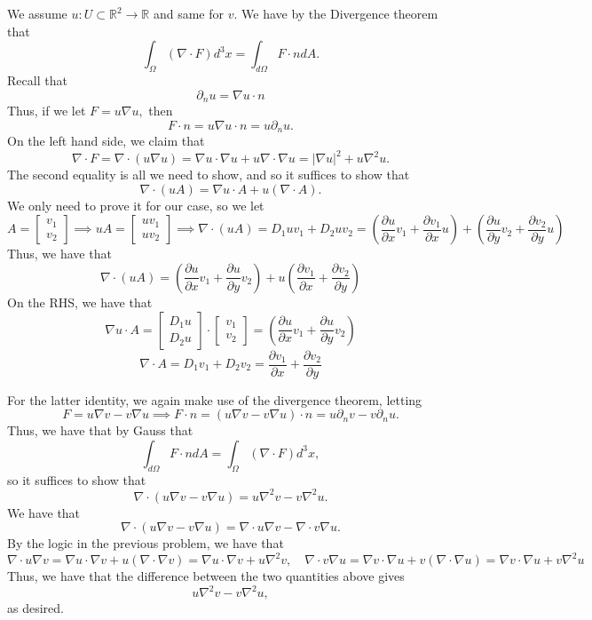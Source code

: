 \documentclass[11pt]{article}
\newcommand{\bbR}{\mathbb{R}}
\begin{document}
\begin{solution}
    We assume $u: U \subset \bbR^2 \to \bbR$ and same for $v.$ We have by the Divergence theorem that 
    \[\int_\Omega (\nabla \cdot F) d^3x = \int_{d\Omega} F \cdot n dA.\]
    Recall that  
    \[\partial_n u  = \nabla u \cdot n\]
    Thus, if we let $F = u\nabla u,$ then \[F\cdot n = u\nabla u \cdot n = u\partial_nu.\]
    On the left hand side, we claim that 
    \[\nabla \cdot F = \nabla \cdot (u\nabla u) = \nabla u \cdot \nabla u + u\nabla \cdot \nabla u = |\nabla u|^2 + u\nabla^2 u.\] The second equality is all we need to show, and so it suffices to show that
    \[\nabla \cdot (uA) = \nabla u \cdot A + u(\nabla \cdot A).\]
    We only need to prove it for our case, so we let 
    \[A = \begin{bmatrix}
        v_1\\ v_2
    \end{bmatrix} \implies uA = \begin{bmatrix}
        uv_1\\ uv_2
    \end{bmatrix} \implies \nabla \cdot (uA) = D_1 uv_1 + D_2 uv_2 = \left(\frac{\partial u}{\partial x}v_1 + \frac{\partial v_1} {\partial x}u\right) + \left(\frac{\partial u}{\partial y}v_2 + \frac{\partial v_2} {\partial y}u\right)\]
    Thus, we have that 
    \[\nabla \cdot (uA) = \left(\frac{\partial u}{\partial x}v_1 + \frac{\partial u}{\partial y}v_2\right) +u\left(\frac{\partial v_1} {\partial x} + \frac{\partial v_2} {\partial y}\right)\]
    On the RHS, we have that 
    \[\nabla u \cdot A= \begin{bmatrix}
        D_1 u\\ D_2 u
    \end{bmatrix}\cdot \begin{bmatrix}
        v_1\\ v_2
    \end{bmatrix} = \left(\frac{\partial u}{\partial x}v_1 + \frac{\partial u}{\partial y}v_2\right)\]
    \[\nabla\cdot  A = D_1v_1 + D_2v_2 = \frac{\partial v_1} {\partial x} + \frac{\partial v_2} {\partial y}\]

    For the latter identity, we again make use of the divergence theorem, letting 
    \[F = u\nabla v - v\nabla u \implies F \cdot n = (u\nabla v - v\nabla u)\cdot n = u\partial_n v - v\partial_n u.\]
    Thus, we have that by Gauss that 
    \[\int_{d\Omega} F \cdot n dA = \int_\Omega (\nabla \cdot F) d^3x,\] so it suffices to show that 
    \[\nabla \cdot (u\nabla v - v\nabla u) = u\nabla^2 v  - v\nabla^2 u.\]
    We have that 
    \[\nabla \cdot (u\nabla v - v\nabla u) = \nabla \cdot u\nabla v - \nabla \cdot v\nabla u.\] By the logic in the previous problem, we have that 
    \[\nabla \cdot u \nabla v = \nabla u \cdot \nabla v + u(\nabla \cdot \nabla v) = \nabla u \cdot \nabla v + u\nabla^2v, \quad \nabla\cdot v\nabla u = \nabla v \cdot \nabla u + v(\nabla \cdot \nabla u) = \nabla v \cdot \nabla u + v\nabla^2 u\]
    Thus, we have that the difference between the two quantities above gives 
    \[u\nabla^2 v - v\nabla^2 u,\] as desired.
\end{solution}
\newpage
\end{document}
